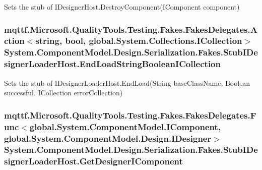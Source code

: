 Sets the stub of I\-Designer\-Host.\-Destroy\-Component(\-I\-Component component)

\hypertarget{class_system_1_1_component_model_1_1_design_1_1_serialization_1_1_fakes_1_1_stub_i_designer_loader_host_a927721619f5fb84cfbf0b40bb77e9fae}{
\subsubsection[{End\-Load\-String\-Boolean\-I\-Collection}]{\setlength{\rightskip}{0pt plus 5cm}mqttf.\-Microsoft.\-Quality\-Tools.\-Testing.\-Fakes.\-Fakes\-Delegates.\-Action$<$string, bool, global.\-System.\-Collections.\-I\-Collection$>$ System.\-Component\-Model.\-Design.\-Serialization.\-Fakes.\-Stub\-I\-Designer\-Loader\-Host.\-End\-Load\-String\-Boolean\-I\-Collection}}\label{class_system_1_1_component_model_1_1_design_1_1_serialization_1_1_fakes_1_1_stub_i_designer_loader_host_a927721619f5fb84cfbf0b40bb77e9fae}


Sets the stub of I\-Designer\-Loader\-Host.\-End\-Load(\-String base\-Class\-Name, Boolean successful, I\-Collection error\-Collection)

\hypertarget{class_system_1_1_component_model_1_1_design_1_1_serialization_1_1_fakes_1_1_stub_i_designer_loader_host_ae40737e678e280e7b5afd797e1e689d8}{
\subsubsection[{Get\-Designer\-I\-Component}]{\setlength{\rightskip}{0pt plus 5cm}mqttf.\-Microsoft.\-Quality\-Tools.\-Testing.\-Fakes.\-Fakes\-Delegates.\-Func$<$global.\-System.\-Component\-Model.\-I\-Component, global.\-System.\-Component\-Model.\-Design.\-I\-Designer$>$ System.\-Component\-Model.\-Design.\-Serialization.\-Fakes.\-Stub\-I\-Designer\-Loader\-Host.\-Get\-Designer\-I\-Component}}\label{class_system_1_1_component_model_1_1_design_1_1_serialization_1_1_fakes_1_1_stub_i_designer_loader_host_ae40737e678e280e7b5afd797e1e689d8}


